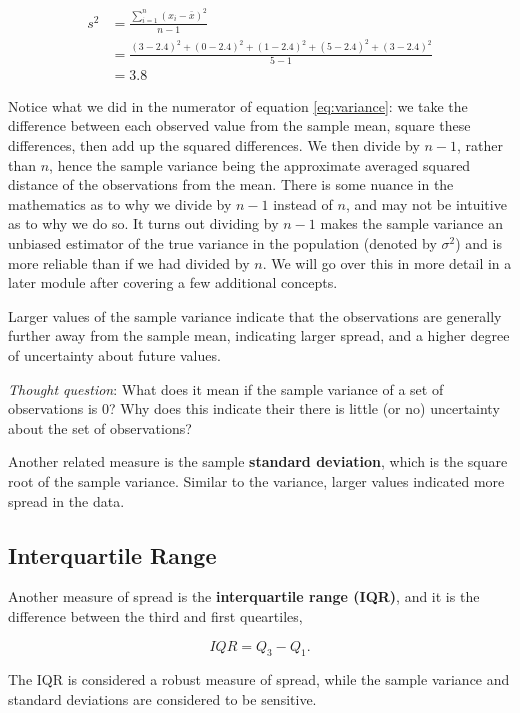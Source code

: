 \documentclass[
]{book}
\begin{document}
\[
\begin{split}
s^2 &= \frac{\sum_{i=1}^n (x_i-\bar{x})^2}{n-1}\\
 &= \frac{(3-2.4)^2 + (0-2.4)^2 + (1-2.4)^2 + (5-2.4)^2 + (3-2.4)^2}{5-1} \\
&= 3.8 
\end{split}
\]

Notice what we did in the numerator of equation \eqref{eq:variance}: we take the difference between each observed value from the sample mean, square these differences, then add up the squared differences. We then divide by \(n-1\), rather than \(n\), hence the sample variance being the approximate averaged squared distance of the observations from the mean. There is some nuance in the mathematics as to why we divide by \(n-1\) instead of \(n\), and may not be intuitive as to why we do so. It turns out dividing by \(n-1\) makes the sample variance an unbiased estimator of the true variance in the population (denoted by \(\sigma^2\)) and is more reliable than if we had divided by \(n\). We will go over this in more detail in a later module after covering a few additional concepts.

Larger values of the sample variance indicate that the observations are generally further away from the sample mean, indicating larger spread, and a higher degree of uncertainty about future values.

\emph{Thought question}: What does it mean if the sample variance of a set of observations is 0? Why does this indicate their there is little (or no) uncertainty about the set of observations?

Another related measure is the sample \textbf{standard deviation}, which is the square root of the sample variance. Similar to the variance, larger values indicated more spread in the data.

\subsection{Interquartile Range}\label{interquartile-range}

Another measure of spread is the \textbf{interquartile range (IQR)}, and it is the difference between the third and first queartiles,

\begin{equation} 
IQR = Q_3 - Q_1.
\label{eq:IQR}
\end{equation}

The IQR is considered a robust measure of spread, while the sample variance and standard deviations are considered to be sensitive.
\end{document}
